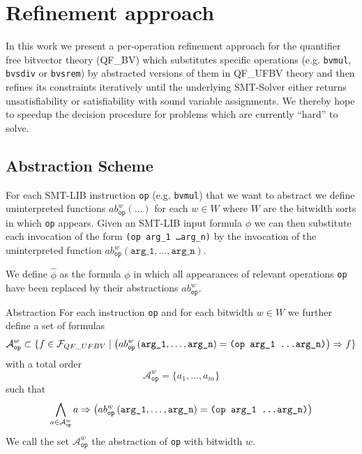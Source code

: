 \chapter{Refinement approach}
\label{ch:refinement_approach}
In this work we present a per-operation refinement approach for the quantifier free bitvector theory (QF\_BV) which substitutes specific operations (e.g. \texttt{bvmul}, \texttt{bvsdiv} or \texttt{bvsrem}) by abstracted versions of them in QF\_UFBV theory and then refines its constraints iteratively until the underlying SMT-Solver either returns unsatisfiability or satisfiability with sound variable assignments. We thereby hope to speedup the decision procedure for problems which are currently \enquote{hard} to solve.

\section{Abstraction Scheme}
\label{sec:refinement_approach:abstraction_scheme}
For each SMT-LIB instruction \texttt{op} (e.g. \texttt{bvmul}) that we want to abstract we define uninterpreted functions $ab_{\texttt{op}}^w\left(\dots\right)$ for each $w\in W$ where $W$ are the bitwidth sorts in which \texttt{op} appears.
Given an SMT-LIB input formula $\phi$ we can then substitute each invocation of the form \texttt{(op arg\_1 \dots arg\_n)} by the invocation of the uninterpreted function $ab_{\texttt{op}}^w\left(\texttt{arg\_1}, \dots, \texttt{arg\_n}\right)$.

We define $\hat{\phi}$ as the formula $\phi$ in which all appearances of relevant operations \texttt{op} have been replaced by their abstractions $ab_\texttt{op}^w$.\\

\begin{definition}{Abstraction}
For each instruction \texttt{op} and for each bitwidth $w\in W$  we further define a set of formulas
\[\mathcal{A}_\texttt{op}^w \subset \{f \in \mathcal{F}_{QF\_UFBV} \mid \left( ab_{\texttt{op}}^w\left(\texttt{arg\_1}, \dots, \texttt{arg\_n}\right)=\texttt{(op arg\_1 \dots arg\_n)} \right) \Rightarrow f\}\]
with a total order
\[\mathcal{A}_\texttt{op}^w  = \{a_1, \dots, a_m\}\]
such that
\[\bigwedge\limits_{a\in\mathcal{A}_\texttt{op}^w} a \Rightarrow \left(ab_{\texttt{op}}^w\left(\texttt{arg\_1}, \dots, \texttt{arg\_n}\right)=\texttt{(op arg\_1 \dots arg\_n)}\right)\]
We call the set $\mathcal{A}_\texttt{op}^w$ the abstraction of \texttt{op} with bitwidth $w$.
\end{definition}

